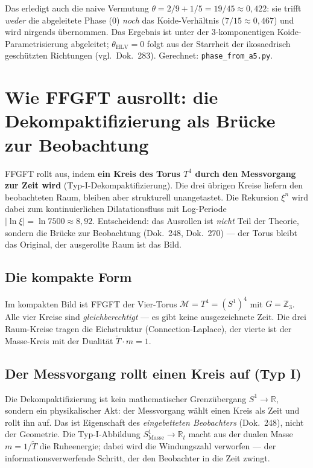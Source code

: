 \noindent Das erledigt auch die naive Vermutung $\theta=2/9+1/5=19/45\approx0{,}422$: sie
trifft \emph{weder} die abgeleitete Phase ($0$) \emph{noch} das Koide-Verh\"altnis
($7/15\approx0{,}467$) und wird nirgends \"ubernommen. Das Ergebnis ist unter der
$3$-komponentigen Koide-Parametrisierung abgeleitet; $\theta_{\mathrm{HLV}}=0$ folgt aus der
Starrheit der ikosaedrisch gesch\"utzten Richtungen (vgl.\ Dok.~283). Gerechnet:
\texttt{phase\_from\_a5.py}.

\section{Wie FFGFT ausrollt: die Dekompaktifizierung als Br\"ucke zur Beobachtung}
FFGFT rollt aus, indem \textbf{ein Kreis des Torus $T^4$ durch den Messvorgang zur Zeit wird}
(Typ-I-Dekompaktifizierung). Die drei \"ubrigen Kreise liefern den beobachteten Raum, bleiben aber
strukturell unangetastet. Die Rekursion $\xi^n$ wird dabei zum kontinuierlichen Dilatationsfluss mit
Log-Periode $|\ln\xi|=\ln 7500\approx 8{,}92$. Entscheidend: das Ausrollen ist \emph{nicht} Teil der
Theorie, sondern die Br\"ucke zur Beobachtung (Dok.~248, Dok.~270) --- der Torus bleibt das Original,
der ausgerollte Raum ist das Bild.

\subsection{Die kompakte Form}
Im kompakten Bild ist FFGFT der Vier-Torus $\mathcal{M}=T^4=(S^1)^4$ mit $G=\mathbb{Z}_3$. Alle vier
Kreise sind \emph{gleichberechtigt} --- es gibt keine ausgezeichnete Zeit. Die drei Raum-Kreise
tragen die Eichstruktur (Connection-Laplace), der vierte ist der Masse-Kreis mit der Dualit\"at
$\tilde{T}\cdot m=1$.

\subsection{Der Messvorgang rollt einen Kreis auf (Typ I)}
Die Dekompaktifizierung ist kein mathematischer Grenz\"ubergang $S^1\to\mathbb{R}$, sondern ein
physikalischer Akt: der Messvorgang w\"ahlt einen Kreis als Zeit und rollt ihn auf. Das ist
Eigenschaft des \emph{eingebetteten Beobachters} (Dok.~248), nicht der Geometrie. Die Typ-I-Abbildung
$S^1_{\text{Masse}}\to\mathbb{R}_t$ macht aus der dualen Masse $m=1/\tilde{T}$ die Ruheenergie; dabei
wird die Windungszahl verworfen --- der informationsverwerfende Schritt, der den Beobachter in die
Zeit zwingt.

